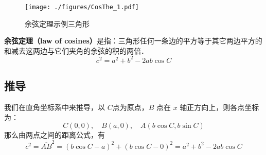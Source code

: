 
\begin{issues}
\issueDraft
\end{issues}
\begin{figure}[ht]
\centering
\texttt{[image: ./figures/CosThe\_1.pdf]}
\caption{余弦定理示例三角形} \label{CosThe_fig1}
\end{figure}
\textbf{余弦定理（law of cosines）}是指：三角形任何一条边的平方等于其它两边平方的和减去这两边与它们夹角的余弦的积的两倍．
\begin{equation}\label{CosThe_eq1}
c^2=a^2 + b^2 - 2ab\cos C
\end{equation}


\subsection{推导}
我们在直角坐标系中来推导，以 $C$点为原点，$B$ 点在 $x$ 轴正方向上，则各点坐标为：
\begin{equation}
C(0,0),\quad B(a,0),\quad A(b\cos C,b\sin C)
\end{equation}
那么由两点之间的距离公式，有
\begin{equation}
c^2=\overline{AB}^2=(b\cos C-a)^2+(b\cos C-0)^2=a^2+b^2-2ab\cos C
\end{equation}

